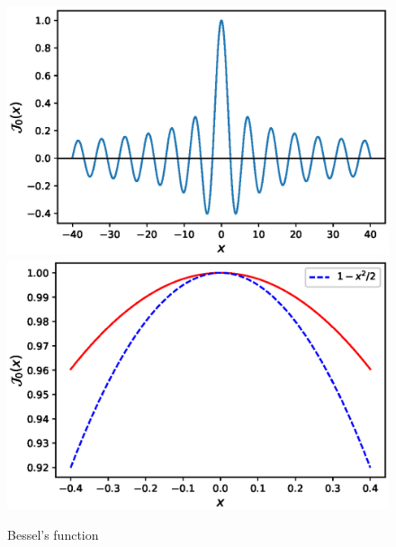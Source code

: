 \documentclass[11pt,a4paper]{article}
\begin{document}
\begin{figure}[!ht]
\begin{center}
\includegraphics[scale=0.5]{pics/bessel_fun.eps} 
\includegraphics[scale=0.5]{pics/bessel_fun_zoom.eps} 
\caption{Bessel's function }
\end{center}
\end{figure}

 


%
\end{document}
